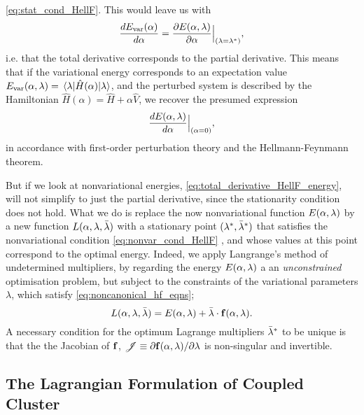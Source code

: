 \autoref{eq:stat_cond_HellF}. This would leave us with 
\begin{equation}
    \frac{d E_{\text{var}}(\alpha)}{d\alpha} 
    = \frac{\partial E(\alpha, \vb{\lambda})}{\partial\alpha}\Big\lvert_{(\vb{\lambda} = \vb{\lambda}^*)},
\end{equation}
i.e. that the total derivative corresponds to the partial derivative. This means that if the variational 
energy corresponds to an expectation value 
$E_{\text{var}}(\alpha, \vb{\lambda}) = \mel{\vb{\lambda}}{\hat{H}(\alpha)}{\vb{\lambda}}$, and the 
perturbed system is described by the Hamiltonian $\hat{H}(\alpha) = \hat{H} + \alpha\hat{V}$, we 
recover the presumed expression
\begin{equation}
\frac{dE(\alpha, \vb{\lambda})}{d\alpha}\Big\lvert_{(\alpha = 0)},
\end{equation}
in accordance with first-order perturbation theory and the Hellmann-Feynmann theorem.

But if we look at nonvariational energies, \autoref{eq:total_derivative_HellF_energy},
will not simplify to just the partial derivative, since the stationarity condition does not hold. 
What we do is replace the now nonvariational function $E(\alpha, \vb{\lambda})$ by a new function 
$L(\alpha, \vb{\lambda}, \bar{\vb{\lambda}})$ with a stationary point 
$(\vb{\lambda}^*, \bar{\vb{\lambda}}^*)$ that satisfies the nonvariational condition
\autoref{eq:nonvar_cond_HellF}
, and whose values at this point correspond to the optimal
energy. Indeed, we apply Langrange's method of undetermined multipliers, by regarding the 
energy $E(\alpha, \vb{\lambda})$ a an \emph{unconstrained} optimisation problem, but 
subject to the constraints of the variational parameters $\lambda$, which satisfy
\autoref{eq:noncanonical_hf_eqns};
\begin{equation}
    \label{eq:langrange_method}
    L(\alpha, \vb{\lambda}, \bar{\vb{\lambda}})
    = E(\alpha, \vb{\lambda}) + \bar{\vb{\lambda}} \cdot \vb{f}(\alpha, \vb{\lambda}).
\end{equation}
A necessary condition for the optimum Lagrange multipliers $\bar{\vb{\lambda}}^*$ to 
be unique is that the the Jacobian of $\vb{f}$, 
$\mathscr{J} \equiv \partial \vb{f}(\alpha, \vb{\lambda})/\partial \lambda$ is non-singular 
and invertible.

\subsection{The Lagrangian Formulation of Coupled Cluster}

